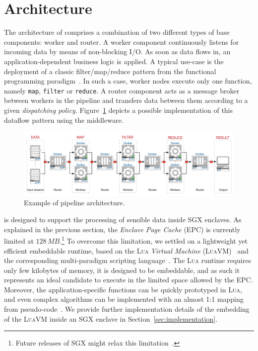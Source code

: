 \section{Architecture}\label{sec:architecture}
The architecture of \SYS{} comprises a combination of two different types of base components: \textsf{worker} and \textsf{router}.
A \textsf{worker} component continuously listens for incoming data by means of non-blocking I/O.
As soon as data flows in, an application-dependent business logic is applied.
A typical use-case is the deployment of a classic filter/map/reduce pattern from the functional programming paradigm~\cite{bird_introduction_1988}.
In such a case, worker nodes execute only one function, namely \texttt{map}, \texttt{filter} or \texttt{reduce}.
A \textsf{router} component acts as a message broker between workers in the pipeline and transfers data between them according to a given \emph{dispatching policy}.
Figure~\ref{fig:architecture_pipeline} depicts a possible implementation of this dataflow pattern using the \SYS{} middleware.

\begin{figure}[!t]
  \centering
  \includegraphics[width=\linewidth]{images/architecture_pipeline}
  \caption{Example of \SYS{} pipeline architecture.}
  \label{fig:architecture_pipeline}
\end{figure}


\SYS{} is designed to support the processing of sensible data inside SGX enclaves.
As explained in the previous section, the \emph{Enclave Page Cache} (EPC) is currently limited at $128\,MB$.\footnote{Future releases of SGX might relax this limitation~\cite{mckeen2016intel}.}
To overcome this limitation, we settled on a lightweight yet efficient embeddable runtime, based on the \textsc{Lua} \emph{Virtual Machine} (\textsc{LuaVM})~\cite{ierusalimschy_luaextensible_1996} and the corresponding multi-paradigm scripting language~\cite{lualang}.
The \textsc{Lua} runtime requires only few kilobytes of memory, it is designed to be embeddable, and as such it represents an ideal candidate to execute in the limited space allowed by the EPC.
Moreover, the application-specific functions can be quickly prototyped in \textsc{Lua}, and even complex algorithms can be implemented with an almost 1:1 mapping from pseudo-code~\cite{leonini2009splay}.
We provide further implementation details of the embedding of the \textsc{LuaVM} inside an SGX enclave in Section~\ref{sec:implementation}.

